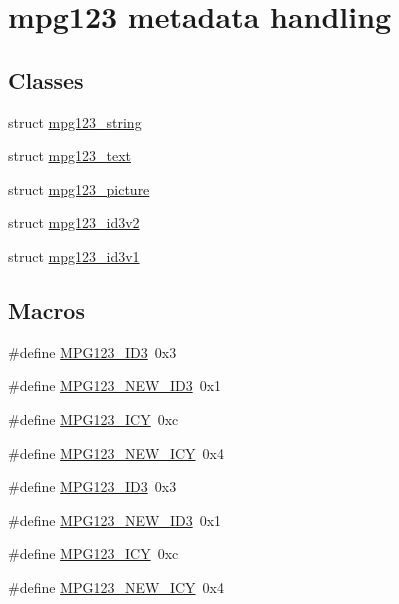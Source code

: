\hypertarget{group__mpg123__metadata}{}\section{mpg123 metadata handling}
\label{group__mpg123__metadata}
\subsection*{Classes}
\begin{DoxyCompactItemize}
\item 
struct \hyperlink{structmpg123__string}{mpg123\+\_\+string}
\item 
struct \hyperlink{structmpg123__text}{mpg123\+\_\+text}
\item 
struct \hyperlink{structmpg123__picture}{mpg123\+\_\+picture}
\item 
struct \hyperlink{structmpg123__id3v2}{mpg123\+\_\+id3v2}
\item 
struct \hyperlink{structmpg123__id3v1}{mpg123\+\_\+id3v1}
\end{DoxyCompactItemize}
\subsection*{Macros}
\begin{DoxyCompactItemize}
\item 
\#define \hyperlink{group__mpg123__metadata_gacee1d4e2cac4601f57eddadcc828f66c}{M\+P\+G123\+\_\+\+I\+D3}~0x3
\item 
\#define \hyperlink{group__mpg123__metadata_ga3fb42527b89f66d9caa6aee4fa6aaaae}{M\+P\+G123\+\_\+\+N\+E\+W\+\_\+\+I\+D3}~0x1
\item 
\#define \hyperlink{group__mpg123__metadata_ga8beaa04ade9db672e2bdf722c66b61ce}{M\+P\+G123\+\_\+\+I\+CY}~0xc
\item 
\#define \hyperlink{group__mpg123__metadata_ga25db33a48f531fd4da02dbf12d53e5be}{M\+P\+G123\+\_\+\+N\+E\+W\+\_\+\+I\+CY}~0x4
\item 
\#define \hyperlink{group__mpg123__metadata_gacee1d4e2cac4601f57eddadcc828f66c}{M\+P\+G123\+\_\+\+I\+D3}~0x3
\item 
\#define \hyperlink{group__mpg123__metadata_ga3fb42527b89f66d9caa6aee4fa6aaaae}{M\+P\+G123\+\_\+\+N\+E\+W\+\_\+\+I\+D3}~0x1
\item 
\#define \hyperlink{group__mpg123__metadata_ga8beaa04ade9db672e2bdf722c66b61ce}{M\+P\+G123\+\_\+\+I\+CY}~0xc
\item 
\#define \hyperlink{group__mpg123__metadata_ga25db33a48f531fd4da02dbf12d53e5be}{M\+P\+G123\+\_\+\+N\+E\+W\+\_\+\+I\+CY}~0x4
\end{DoxyCompactItemize}
